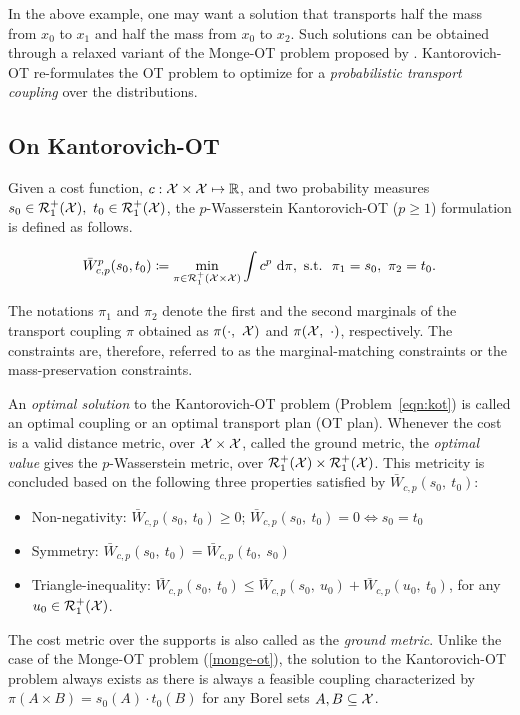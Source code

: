 In the above example, one may want a solution that transports half the mass from $x_0$ to $x_1$ and half the mass from $x_0$ to $x_2$. Such solutions can be obtained through a relaxed variant of the Monge-OT problem proposed by \cite{KatoroOT}. Kantorovich-OT re-formulates the OT problem to optimize for a \textit{probabilistic transport coupling} over the distributions.
\subsection{On Kantorovich-OT}\label{bg:ot-variants}
Given a cost function, $c:\mathcal{X}\times\mathcal{X}\mapsto\mathbb{R}$, and two probability measures $s_0\in\calR^+_1(\calX),\ t_0\in\calR^+_1(\calX)$, the $p$-Wasserstein Kantorovich-OT ($p\geq 1$) formulation is defined as follows.
\begin{definition}
\begin{equation}\label{eqn:kot}
\bar{W}_{c, p}^p(s_0,t_0)\coloneqq \min\limits_{\pi\in\mathcal{R}^+_1(\mathcal{X}\times\mathcal{X})}\int c^p\ \textup{d}\pi, \textup{ s.t.}\ \ \pi_1=s_0,\ \pi_2=t_0.
\end{equation}
\end{definition}
The notations $\pi_1$ and $\pi_2$ denote the first and the second marginals of the transport coupling $\pi$ obtained as $\pi(\cdot,\  \mathcal{X})$ and $\pi(\mathcal{X}, \ \cdot)$, respectively. The constraints are, therefore, referred to as the marginal-matching constraints or the mass-preservation constraints.

An \textit{optimal solution} to the Kantorovich-OT problem  (Problem~\ref{eqn:kot}) is called an optimal coupling or an optimal transport plan (OT plan).
Whenever the cost is a valid distance metric, over $\mathcal{X}\times \mathcal{X}$, called the ground metric, the \textit{optimal value} gives the $p$-Wasserstein metric, over $\mathcal{R}^+_1(\mathcal{X}) \times \mathcal{R}^+_1(\mathcal{X})$. This metricity is concluded based on the following three properties satisfied by $\bar{W}_{c, p}(s_0,\ t_0)$: 
\begin{itemize}
    \item Non-negativity: $\bar{W}_{c, p}(s_0,\ t_0)\geq 0$; $\bar{W}_{c, p}(s_0,\ t_0)= 0 \iff s_0=t_0$
    \item Symmetry: $\bar{W}_{c, p}(s_0,\ t_0)=\bar{W}_{c, p}(t_0,\ s_0)$
    \item Triangle-inequality: $\bar{W}_{c, p}(s_0,\ t_0)\leq \bar{W}_{c, p}(s_0,\ u_0) + \bar{W}_{c, p}(u_0,\ t_0)$, for any $u_0\in \mathcal{R}_1^+(\mathcal{X})$.
\end{itemize}
The cost metric over the supports is also called as the \textit{ground metric}.
Unlike the case of the Monge-OT problem (\ref{monge-ot}), the solution to the Kantorovich-OT problem always exists as there is always a feasible coupling characterized by $\pi(A\times B)=s_0(A)\cdot t_0(B)$ for any Borel sets $A, B\subseteq \mathcal{X}$.

